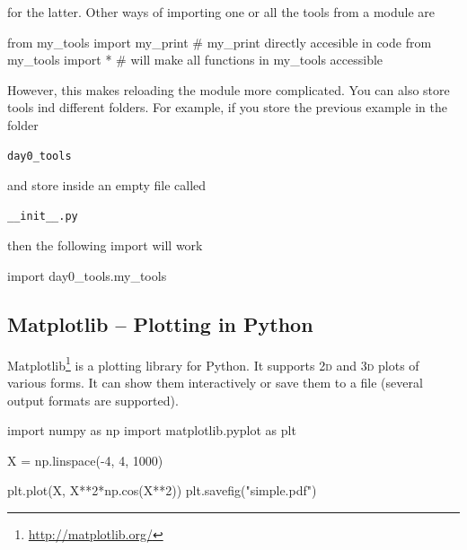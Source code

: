 \noindent for the latter. Other ways of importing one or all the tools from a module are

\begin{python}
from my_tools import my_print  # my_print directly accesible in code
from my_tools import *         # will make all functions in my_tools accessible
\end{python}

\noindent However, this makes reloading the module more complicated. You can also store tools ind different folders. For example, if you store the previous
example in the folder

\begin{verbatim}
day0_tools
\end{verbatim}

\noindent and store inside an empty file called  

\begin{verbatim}
__init__.py
\end{verbatim}

\noindent then the following import will work

\begin{python}
import day0_tools.my_tools
\end{python}


\subsection{Matplotlib -- Plotting in Python}

Matplotlib\footnote{\url{http://matplotlib.org/}} is a plotting library for Python. It supports \textsc{2d} and \textsc{3d} plots of various forms. It can show them interactively or save them to a file (several output formats are supported).

\begin{python}
import numpy as np
import matplotlib.pyplot as plt

X = np.linspace(-4, 4, 1000)

plt.plot(X, X**2*np.cos(X**2))
plt.savefig("simple.pdf")
\end{python}

